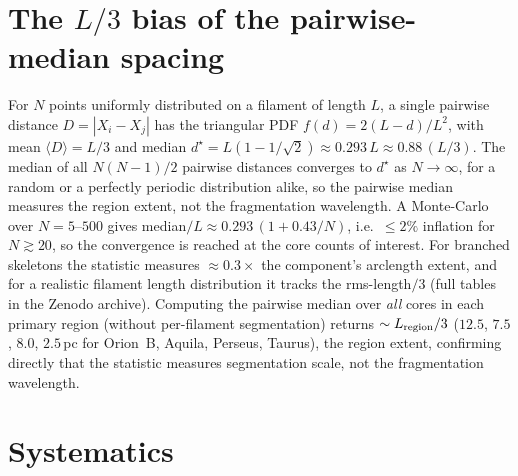 \documentclass[usenatbib,twoside,twocolumn]{mnras}
\begin{document}
\section{The $L/3$ bias of the pairwise-median spacing}
\label{sec:pwmedian}
For $N$ points uniformly distributed on a filament of length $L$, a single pairwise distance $D=|X_i-X_j|$ has the triangular PDF $f(d)=2(L-d)/L^2$, with mean $\langle D\rangle=L/3$ and median $d^\star=L(1-1/\sqrt{2})\approx0.293\,L\approx0.88\,(L/3)$. The median of all $N(N-1)/2$ pairwise distances converges to $d^\star$ as $N\to\infty$, for a random or a perfectly periodic distribution alike, so the pairwise median measures the region extent, not the fragmentation wavelength. A Monte-Carlo over $N=5$--$500$ gives median$/L\approx0.293\,(1+0.43/N)$, i.e.\ $\le2\%$ inflation for $N\gtrsim20$, so the convergence is reached at the core counts of interest. For branched skeletons the statistic measures $\approx0.3\times$ the component's arclength extent, and for a realistic filament length distribution it tracks the rms-length$/3$ (full tables in the Zenodo archive). Computing the pairwise median over \emph{all} cores in each primary region (without per-filament segmentation) returns $\sim L_{\rm region}/3$ ($12.5$, $7.5$, $8.0$, $2.5$\,pc for Orion~B, Aquila, Perseus, Taurus), the region extent, confirming directly that the statistic measures segmentation scale, not the fragmentation wavelength.


\section{Systematics}
\label{sec:systematics}
\end{document}
